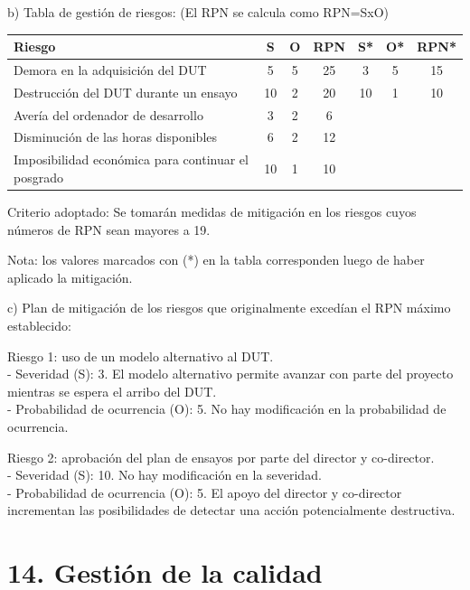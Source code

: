 \documentclass[
11pt, %
]{charter}
\begin{document}
b) Tabla de gestión de riesgos:      (El RPN se calcula como RPN=SxO)

\begin{table}[htpb]
\centering
\begin{tabularx}{\linewidth}{@{}|X|c|c|c|c|c|c|@{}}
\hline
\rowcolor[HTML]{C0C0C0} 
Riesgo                                             & S & O & RPN & S* & O* & RPN* \\ \hline
Demora en la adquisición del DUT                   & 5 & 5 & 25  &3   & 5  & 15   \\ \hline
Destrucción del DUT durante un ensayo              &10 & 2 & 20  &10  & 1  & 10   \\ \hline
Avería del ordenador de desarrollo                 & 3 & 2 & 6   &    &    &      \\ \hline
Disminución de las horas disponibles               & 6 & 2 & 12  &    &    &      \\ \hline
Imposibilidad económica para continuar el posgrado &10 & 1 & 10  &    &    &      \\ \hline
\end{tabularx}%
\end{table}

Criterio adoptado: 
Se tomarán medidas de mitigación en los riesgos cuyos números de RPN sean mayores a 19.

Nota: los valores marcados con (*) en la tabla corresponden luego de haber aplicado la mitigación.

c) Plan de mitigación de los riesgos que originalmente excedían el RPN máximo establecido:
 
Riesgo 1: uso de un modelo alternativo al DUT. \\
  - Severidad (S): 3. El modelo alternativo permite avanzar con parte del proyecto mientras se espera el arribo del DUT. \\
  - Probabilidad de ocurrencia (O): 5. No hay modificación en la probabilidad de ocurrencia.

Riesgo 2: aprobación del plan de ensayos por parte del director y co-director. \\
  - Severidad (S): 10. No hay modificación en la severidad. \\
  - Probabilidad de ocurrencia (O): 5. El apoyo del director y co-director incrementan las posibilidades de detectar una acción potencialmente destructiva.

\section{14. Gestión de la calidad}
\label{sec:calidad}
\end{document}
